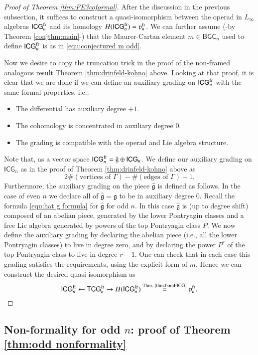 \documentclass[a4paper]{amsart}
\theoremstyle{plain}
\theoremstyle{definition}
\newcommand{\alg}[1]{\mathfrak{{#1}}}
\newcommand{\TCG}{{\mathsf{TCG}}}
\newcommand{\ICG}{\mathsf{ICG}}
\newcommand{\ICGF}{\ICG^{\rm fr}}
\newcommand{\TCGF}{\TCG^{\rm fr}}
\newcommand{\BGC}{\mathsf{BGC}}
\newcommand{\DK}{{\alg p}}
\newcommand{\DKF}{\DK^{\mathrm{fr}}}
\begin{document}
\begin{proof}[Proof of Theorem \ref{thm:FE3coformal}]
After the discussion in the previous subsection, it suffices to construct a quasi-isomorphism between the operad in $L_\infty$ algebras $\ICGF_n$ and its homology $H(\ICGF_n)=\DKF_n$. We can further assume (-by Theorem \ref{conjthm:main}-) that the Maurer-Cartan element $m\in \BGC_n$ used to define $\ICGF_n$ is as in \eqref{equ:conjectured m odd}.

Now we desire to copy the truncation trick in the proof of the non-framed analogous result Theorem \ref{thm:drinfeld-kohno} above. Looking at that proof, it is clear that we are done if we can define an auxiliary grading on $\ICGF_n$ with the same formal properties, i.e.: 

\begin{itemize}
\item The differential has auxiliary degree $+1$.
\item The cohomology is concentrated in auxiliary degree $0$.
\item The grading is compatible with the operad and Lie algebra structure.
\end{itemize}

Note that, as a vector space $\ICGF_n=\hat{\alg g}\oplus \ICG_n$. We define our auxiliary grading on $\ICG_n$ as in the proof of Theorem \ref{thm:drinfeld-kohno} above as 
\[
2 \# (\text{vertices of }\Gamma) -  \# (\text{edges of }\Gamma) +1.
\]
Furthermore, the auxiliary grading on the piece $\hat{\alg g}$ is defined as follows. 
In the case of even $n$ we declare all of $\hat{\alg g}=\alg g$ to be in auxiliary degree $0$. 
Recall the formula \eqref{equ:hat g formula} for $\hat{\alg g}$ for odd $n$. In this case $\hat{\alg g}$ is (up to degree shift) composed of an abelian piece, generated by the lower Pontryagin classes and a free Lie algebra generated by powers of the top Pontryagin class $P$. We now define the auxiliary grading by declaring the abelian piece (i.e., all the lower Pontryagin classes) to live in degree zero, and by declaring the power  $P^r$ of the top Pontryagin class to live in degree $r-1$.
One can check that in each case this grading satisfies the requirements, using the explicit form of $m$. Hence we can construct the desired quasi-isomorphism as
\[
\ICGF_n\leftarrow \TCGF_n \to H(\ICGF_n) \stackrel{\text{Thm. \ref{thm:homFICG}}}{=}\DKF_n.
\]
\end{proof}



\subsection{Non-formality for odd \texorpdfstring{$n$}{n}: proof of Theorem \texorpdfstring{\ref{thm:odd nonformality}}{} }
\end{document}
